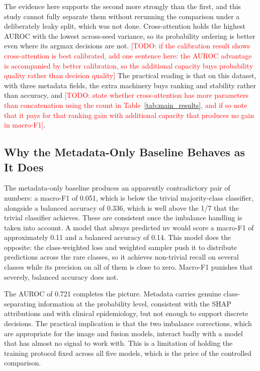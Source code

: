 \documentclass[conference]{IEEEtran}
\newcommand{\TODO}[1]{\textcolor{red}{[TODO: #1]}}
\begin{document}
The evidence here supports the second more strongly than the first, and this study cannot fully separate them without rerunning the comparison under a deliberately leaky split, which was not done. Cross-attention holds the highest AUROC with the lowest across-seed variance, so its probability ordering is better even where its argmax decisions are not. \TODO{if the calibration result shows cross-attention is best calibrated, add one sentence here: the AUROC advantage is accompanied by better calibration, so the additional capacity buys probability quality rather than decision quality} The practical reading is that on this dataset, with three metadata fields, the extra machinery buys ranking and stability rather than accuracy, and \TODO{state whether cross-attention has more parameters than concatenation using the count in Table~\ref{tab:main_results}, and if so note that it pays for that ranking gain with additional capacity that produces no gain in macro-F1}.

\subsection{Why the Metadata-Only Baseline Behaves as It Does}

The metadata-only baseline produces an apparently contradictory pair of numbers: a macro-F1 of 0.051, which is below the trivial majority-class classifier, alongside a balanced accuracy of 0.336, which is well above the 1/7 that the trivial classifier achieves. These are consistent once the imbalance handling is taken into account. A model that always predicted nv would score a macro-F1 of approximately 0.11 and a balanced accuracy of 0.14. This model does the opposite: the class-weighted loss and weighted sampler push it to distribute predictions across the rare classes, so it achieves non-trivial recall on several classes while its precision on all of them is close to zero. Macro-F1 punishes that severely, balanced accuracy does not.

The AUROC of 0.721 completes the picture. Metadata carries genuine class-separating information at the probability level, consistent with the SHAP attributions and with clinical epidemiology, but not enough to support discrete decisions. The practical implication is that the two imbalance corrections, which are appropriate for the image and fusion models, interact badly with a model that has almost no signal to work with. This is a limitation of holding the training protocol fixed across all five models, which is the price of the controlled comparison.
\end{document}
